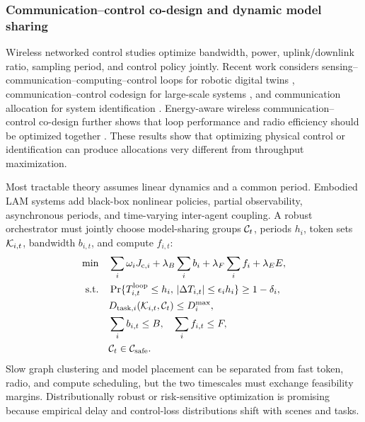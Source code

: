 \documentclass[letterpaper,journal]{IEEEtran}
\begin{document}
\subsubsection{Communication--control co-design and dynamic model sharing}
Wireless networked control studies optimize bandwidth, power, uplink/downlink
ratio, sampling period, and control policy jointly. Recent work considers
sensing--communication--computing--control loops for robotic digital twins
\cite{fang}, communication--control codesign for large-scale systems
\cite{pang}, and communication allocation for system identification
\cite{systemid}. Energy-aware wireless communication--control co-design
further shows that loop performance and radio efficiency should be optimized
together \cite{energywncs}. These results show that optimizing physical
control or identification can produce allocations very different from
throughput maximization.

Most tractable theory assumes linear dynamics and a common period. Embodied
LAM systems add black-box nonlinear policies, partial observability,
asynchronous periods, and time-varying inter-agent coupling. A robust
orchestrator must jointly choose model-sharing groups ${\cal C}_t$, periods
$h_i$, token sets ${\cal K}_{i,t}$, bandwidth $b_{i,t}$, and compute
$f_{i,t}$:
\begin{subequations}
\begin{align}
\min\quad &\sum_i \omega_i J_{{\rm c},i}
+\lambda_B\sum_i b_i+\lambda_F\sum_i f_i+\lambda_E E,\\
\text{s.t.}\quad&
\Pr\{T_{i,t}^{\rm loop}\le h_i,\,
|\Delta T_{i,t}|\le\epsilon_i h_i\}\ge1-\delta_i,\\
&D_{{\rm task},i}({\cal K}_{i,t},{\cal C}_t)\le D_i^{\max},\\
&\sum_i b_{i,t}\le B,\quad \sum_i f_{i,t}\le F,\\
&{\cal C}_t\in{\cal C}_{\rm safe}.
\end{align}
\label{eq:joint_problem}
\end{subequations}
Slow graph clustering and model placement can be separated from fast token,
radio, and compute scheduling, but the two timescales must exchange
feasibility margins. Distributionally robust or risk-sensitive optimization
is promising because empirical delay and control-loss distributions shift
with scenes and tasks.
\end{document}

